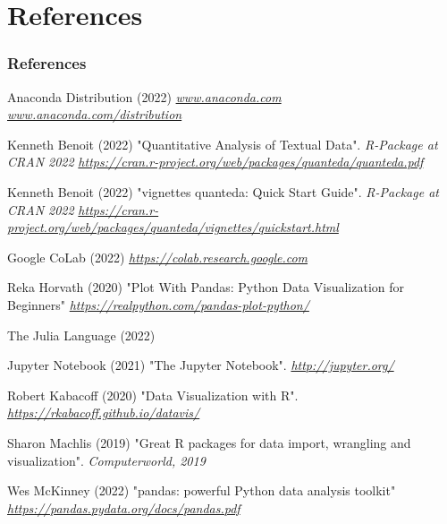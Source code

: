 \documentclass{beamer}
\begin{document}
\section{References}
\begin{frame}[allowframebreaks]
\frametitle{References}
\footnotesize{
\begin{thebibliography}{99} %

 Anaconda Distribution (2022)
\newblock \emph{\href{https://www.anaconda.com}{www.anaconda.com}}
\newblock \emph{\href{https://www.anaconda.com/distribution/}{www.anaconda.com/distribution}}

 Kenneth Benoit (2022)
\newblock "Quantitative Analysis of Textual Data".
\newblock \emph{R-Package at CRAN 2022}
\newblock \emph{\url{https://cran.r-project.org/web/packages/quanteda/quanteda.pdf}}

 Kenneth Benoit (2022)
\newblock "vignettes quanteda: Quick Start Guide".
\emph{R-Package at CRAN 2022}
\newblock \emph{\url{https://cran.r-project.org/web/packages/quanteda/vignettes/quickstart.html}}

 Google CoLab (2022)
\newblock \emph{\url{https://colab.research.google.com}}

 Reka Horvath (2020)
\newblock "Plot With Pandas: Python Data Visualization for Beginners"
\newblock \emph{\url{https://realpython.com/pandas-plot-python/}}

 The Julia Language (2022)

 Jupyter Notebook (2021)
\newblock "The Jupyter Notebook".
\emph{\url{http://jupyter.org/}}

 Robert Kabacoff (2020)
\newblock  "Data Visualization with R".
\emph{\url{https://rkabacoff.github.io/datavis/}}

 Sharon Machlis (2019)
\newblock "Great R packages for data import, wrangling and visualization".
\newblock \emph{Computerworld, 2019}

 Wes McKinney (2022)
\newblock "pandas: powerful Python data analysis toolkit"
\newblock \emph{\url{https://pandas.pydata.org/docs/pandas.pdf }}


\end{thebibliography}}
\end{frame}
\end{document}
